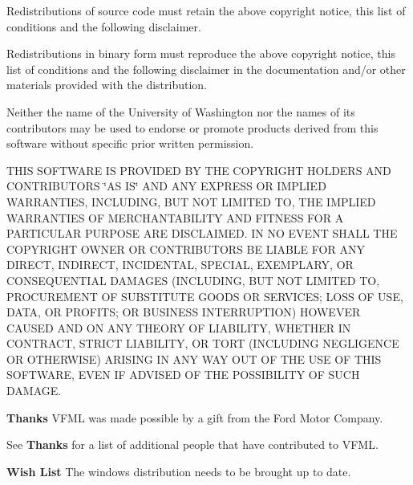 Redistributions of source code must retain the above copyright notice, this list of conditions and the following disclaimer.

Redistributions in binary form must reproduce the above copyright notice, this list of conditions and the following disclaimer in the documentation and/or other materials provided with the distribution.

Neither the name of the University of Washington nor the names of its contributors may be used to endorse or promote products derived from this software without specific prior written permission.

THIS SOFTWARE IS PROVIDED BY THE COPYRIGHT HOLDERS AND CONTRIBUTORS \char`\"{}AS IS\char`\"{} AND ANY EXPRESS OR IMPLIED WARRANTIES, INCLUDING, BUT NOT LIMITED TO, THE IMPLIED WARRANTIES OF MERCHANTABILITY AND FITNESS FOR A PARTICULAR PURPOSE ARE DISCLAIMED. IN NO EVENT SHALL THE COPYRIGHT OWNER OR CONTRIBUTORS BE LIABLE FOR ANY DIRECT, INDIRECT, INCIDENTAL, SPECIAL, EXEMPLARY, OR CONSEQUENTIAL DAMAGES (INCLUDING, BUT NOT LIMITED TO, PROCUREMENT OF SUBSTITUTE GOODS OR SERVICES; LOSS OF USE, DATA, OR PROFITS; OR BUSINESS INTERRUPTION) HOWEVER CAUSED AND ON ANY THEORY OF LIABILITY, WHETHER IN CONTRACT, STRICT LIABILITY, OR TORT (INCLUDING NEGLIGENCE OR OTHERWISE) ARISING IN ANY WAY OUT OF THE USE OF THIS SOFTWARE, EVEN IF ADVISED OF THE POSSIBILITY OF SUCH DAMAGE.





\begin{Desc}
\item[{\bf Thanks}]VFML was made possible by a gift from the Ford Motor Company. \end{Desc}
See {\bf Thanks} for a list of additional people that have contributed to VFML.

\begin{Desc}
\item[{\bf Wish List}]The windows distribution needs to be brought up to date. \end{Desc}
